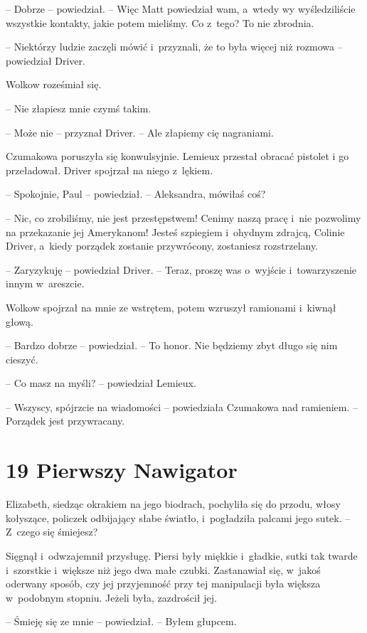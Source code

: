 \documentclass[oneside,polish,12pt,sfheadings]{mwbk}
\begin{document}
-- Dobrze -- powiedział. -- Więc Matt powiedział wam, a~wtedy wy
wyśledziliście wszystkie kontakty, jakie potem mieliśmy. Co z~tego? To
nie zbrodnia.

-- Niektórzy ludzie zaczęli mówić i~przyznali, że to była więcej niż
rozmowa -- powiedział Driver.

Wolkow roześmiał się.

-- Nie złapiesz mnie czymś takim.

-- Może nie -- przyznał Driver. -- Ale złapiemy cię nagraniami.

Czumakowa poruszyła się konwulsyjnie. Lemieux przestał obracać pistolet
i go przeładował. Driver spojrzał na niego z~lękiem.

-- Spokojnie, Paul -- powiedział. -- Aleksandra, mówiłaś coś?

-- Nic, co zrobiliśmy, nie jest przestępstwem! Cenimy naszą pracę i~nie
pozwolimy na przekazanie jej Amerykanom! Jesteś szpiegiem i~ohydnym
zdrajcą, Colinie Driver, a~kiedy porządek zostanie przywrócony,
zostaniesz rozstrzelany.

-- Zaryzykuję -- powiedział Driver. -- Teraz, proszę was o~wyjście i~towarzyszenie innym w~areszcie.

Wolkow spojrzał na mnie ze wstrętem, potem wzruszył ramionami i~kiwnął
głową.

-- Bardzo dobrze -- powiedział. -- To honor. Nie będziemy zbyt długo się
nim cieszyć.

-- Co masz na myśli? -- powiedział Lemieux.

-- Wszyscy, spójrzcie na wiadomości -- powiedziała Czumakowa nad
ramieniem. -- Porządek jest przywracany.

\chapter[Pierwszy Nawigator]{19 Pierwszy Nawigator}



Elizabeth, siedząc okrakiem na jego biodrach, pochyliła się do przodu,
włosy kołyszące, policzek odbijający słabe światło, i~pogładziła palcami
jego sutek. -- Z~czego się śmiejesz?

Sięgnął i~odwzajemnił przysługę. Piersi były miękkie i~gładkie, sutki
tak twarde i~szorstkie i~większe niż jego dwa małe czubki. Zastanawiał
się, w~jakoś oderwany sposób, czy jej przyjemność przy tej manipulacji
była większa w~podobnym stopniu. Jeżeli była, zazdrościł jej.

-- Śmieję się ze mnie -- powiedział. -- Byłem głupcem.
\end{document}
